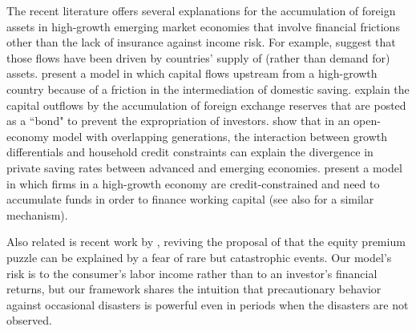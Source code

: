\documentclass[titlepage]{\econtex}\newcommand{\texname}{cjSOE}
\begin{document}
The recent literature offers several explanations for the accumulation of foreign assets in high-growth emerging market economies that involve financial frictions other than the lack of insurance against income risk.
For example, \cite{cfg:globimbalances} suggest that those flows have been driven by countries' supply of (rather than  demand for) assets. \cite{SongStorenslettenZilibotti11} present a model in which capital flows upstream from a high-growth country because of a friction in the intermediation of domestic saving.
\cite{AguiarAmador11} explain the capital outflows by the accumulation of foreign exchange reserves that are posted as a
  ``bond" to prevent the expropriation of investors.
\cite{CoeurdacierGuibaudJin2015} show that in an open-economy model with overlapping generations, the interaction between growth differentials and household credit constraints can explain the divergence in private saving rates between advanced and emerging economies.
\cite{BachettaBenhima2015} present a model in which firms in a high-growth economy are credit-constrained and need to accumulate funds in order to finance working capital (see also 
\cite{BueraShin2009} for a similar mechanism).  

Also related is recent work by \cite{barroDisasters}, reviving the
proposal of \cite{reitzDisasters} that the equity premium puzzle can
be explained by a fear of rare but catastrophic events.  Our model's
risk is to the consumer's labor income rather than to an investor's
financial returns, but our framework shares the intuition that
precautionary behavior against occasional disasters is powerful even
in periods when the disasters are not observed. 
\end{document}
